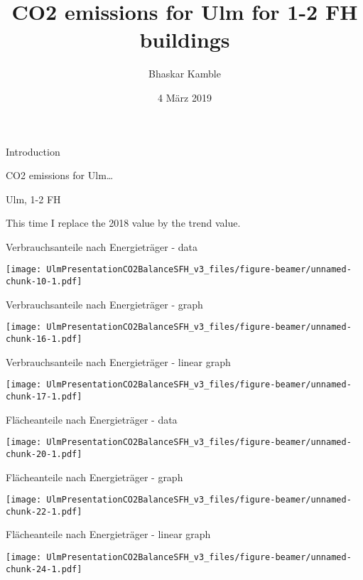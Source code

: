 \documentclass[ignorenonframetext,]{beamer}
\title{CO2 emissions for Ulm for 1-2 FH buildings}
\author{Bhaskar Kamble}
\date{4 März 2019}
\begin{document}
\frame{\titlepage}

\begin{frame}{Introduction}

CO2 emissions for Ulm\ldots{}

\end{frame}

\begin{frame}{Ulm, 1-2 FH}

This time I replace the 2018 value by the trend value.

\end{frame}

\begin{frame}{Verbrauchsanteile nach Energieträger - data}

\texttt{[image: UlmPresentationCO2BalanceSFH\_v3\_files/figure-beamer/unnamed-chunk-10-1.pdf]}

\end{frame}

\begin{frame}{Verbrauchsanteile nach Energieträger - graph}

\texttt{[image: UlmPresentationCO2BalanceSFH\_v3\_files/figure-beamer/unnamed-chunk-16-1.pdf]}

\end{frame}

\begin{frame}{Verbrauchsanteile nach Energieträger - linear graph}

\texttt{[image: UlmPresentationCO2BalanceSFH\_v3\_files/figure-beamer/unnamed-chunk-17-1.pdf]}

\end{frame}

\begin{frame}{Flächeanteile nach Energieträger - data}

\texttt{[image: UlmPresentationCO2BalanceSFH\_v3\_files/figure-beamer/unnamed-chunk-20-1.pdf]}

\end{frame}

\begin{frame}{Flächeanteile nach Energieträger - graph}

\texttt{[image: UlmPresentationCO2BalanceSFH\_v3\_files/figure-beamer/unnamed-chunk-22-1.pdf]}

\end{frame}

\begin{frame}{Flächeanteile nach Energieträger - linear graph}

\texttt{[image: UlmPresentationCO2BalanceSFH\_v3\_files/figure-beamer/unnamed-chunk-24-1.pdf]}

\end{frame}
\end{document}

